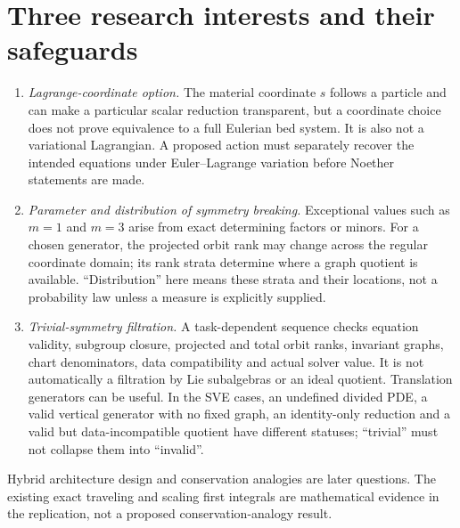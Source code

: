 \documentclass[12pt,a4paper,oneside]{report}
\numberwithin{equation}{chapter}
\begin{document}
\section{Three research interests and their safeguards}
\begin{enumerate}
\item \emph{Lagrange-coordinate option.} The material coordinate $s$ follows
a particle and can make a particular scalar reduction transparent, but a
coordinate choice does not prove equivalence to a full Eulerian bed system.
It is also not a variational Lagrangian. A proposed action must separately
recover the intended equations under Euler--Lagrange variation before
Noether statements are made.
\item \emph{Parameter and distribution of symmetry breaking.} Exceptional
values such as $m=1$ and $m=3$ arise from exact determining factors or
minors. For a chosen generator, the projected orbit rank may change across
the regular coordinate domain; its rank strata determine where a graph
quotient is available. ``Distribution'' here means these strata and their
locations, not a probability law unless a measure is explicitly supplied.
\item \emph{Trivial-symmetry filtration.} A task-dependent sequence checks
equation validity, subgroup closure, projected and total orbit ranks,
invariant graphs, chart denominators, data compatibility and actual solver
value. It is not automatically a filtration by Lie subalgebras or an ideal
quotient. Translation generators can be useful. In the SVE cases, an
undefined divided PDE, a valid vertical generator with no fixed graph,
an identity-only reduction and a valid but data-incompatible quotient have
different statuses; ``trivial'' must not collapse them into ``invalid''.
\end{enumerate}
Hybrid architecture design and conservation analogies are later questions.
The existing exact traveling and scaling first integrals are mathematical
evidence in the replication, not a proposed conservation-analogy result.
\end{document}
